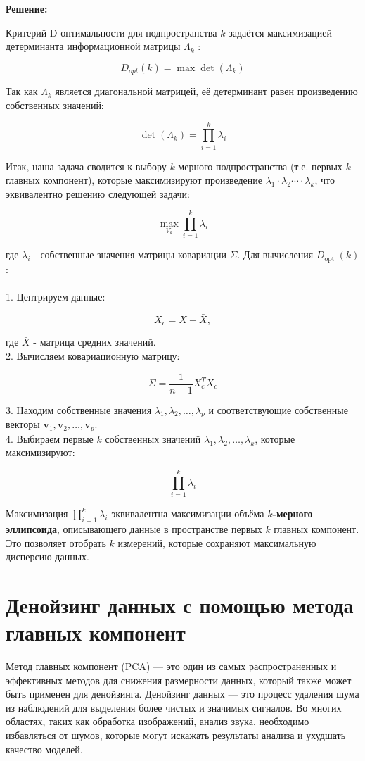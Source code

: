 \textbf{Решение:}

Критерий D-оптимальности для подпространства $k$ задаётся максимизацией детерминанта информационной матрицы $\Lambda_k$ :

$$
D_{o p t}(k)=\max \operatorname{det}\left(\Lambda_k\right)
$$

Так как $\Lambda_k$ является диагональной матрицей, её детерминант равен произведению собственных значений:

$$
\operatorname{det}\left(\Lambda_k\right)=\prod_{i=1}^k \lambda_i
$$

Итак, наша задача сводится к выбору $k$-мерного подпространства (т.е. первых $k$ главных компонент), которые максимизируют произведение $\lambda_1 \cdot \lambda_2 \cdots \cdot \lambda_k$, что эквивалентно решению следующей задачи:

$$
\max _{V_k} \prod_{i=1}^k \lambda_i
$$


где $\lambda_i$ - собственные значения матрицы ковариации $\Sigma$.
Для вычисления $D_{\text {opt }}(k)$ :\\
\\
1. Центрируем данные:

$$
X_c=X-\bar{X},
$$


где $\bar{X}$ - матрица средних значений.\\
2. Вычисляем ковариационную матрицу:

$$
\Sigma=\frac{1}{n-1} X_c^T X_c
$$

3. Находим собственные значения $\lambda_1, \lambda_2, \ldots, \lambda_p$ и соответствующие собственные векторы $\mathbf{v}_1, \mathbf{v}_2, \ldots, \mathbf{v}_p$.\\
4. Выбираем первые $k$ собственных значений $\lambda_1, \lambda_2, \ldots, \lambda_k$, которые максимизируют:

$$
\prod_{i=1}^k \lambda_i
$$

Максимизация $\prod_{i=1}^k \lambda_i$ эквивалентна максимизации объёма \textbf{$k$-мерного эллипсоида}, описывающего данные в пространстве первых $k$ главных компонент. Это позволяет отобрать $k$ измерений, которые сохраняют максимальную дисперсию данных.


\section{Денойзинг данных с помощью метода главных компонент}
Метод главных компонент (PCA) — это один из самых распространенных и эффективных методов для снижения размерности данных, который также может быть применен для денойзинга. Денойзинг данных — это процесс удаления шума из наблюдений для выделения более чистых и значимых сигналов. Во многих областях, таких как обработка изображений, анализ звука, необходимо избавляться от шумов, которые могут искажать результаты анализа и ухудшать качество моделей.

